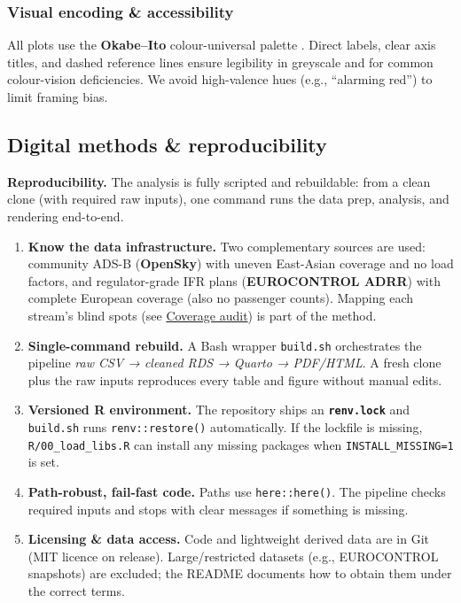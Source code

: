\documentclass[
  authoryear,
  preprint,
  3p,
  onecolumn]{elsarticle}
\providecommand{\tightlist}{%
  \setlength{\itemsep}{0pt}\setlength{\parskip}{0pt}}\usepackage{longtable,booktabs,array}
\begin{document}
\subsubsection{Visual encoding \& accessibility}\label{viz-note}

All plots use the \textbf{Okabe--Ito} colour-universal palette
\citep{okabe2008}. Direct labels, clear axis titles, and dashed
reference lines ensure legibility in greyscale and for common
colour-vision deficiencies. We avoid high-valence hues (e.g., ``alarming
red'') to limit framing bias.

\subsection{Digital methods \& reproducibility}\label{digmethods}

\textbf{Reproducibility.} The analysis is fully scripted and
rebuildable: from a clean clone (with required raw inputs), one command
runs the data prep, analysis, and rendering end-to-end.

\begin{enumerate}
\def\labelenumi{\arabic{enumi}.}
\tightlist
\item
  \textbf{Know the data infrastructure.} Two complementary sources are
  used: community ADS-B (\textbf{OpenSky}) with uneven East-Asian
  coverage and no load factors, and regulator-grade IFR plans
  (\textbf{EUROCONTROL ADRR}) with complete European coverage (also no
  passenger counts). Mapping each stream's blind spots (see
  \hyperref[coverage-audit]{Coverage audit}) is part of the method.
\item
  \textbf{Single-command rebuild.} A Bash wrapper \texttt{build.sh}
  orchestrates the pipeline \emph{raw CSV → cleaned RDS → Quarto →
  PDF/HTML}. A fresh clone plus the raw inputs reproduces every table
  and figure without manual edits.
\item
  \textbf{Versioned R environment.} The repository ships an
  \textbf{\texttt{renv.lock}} and \texttt{build.sh} runs
  \texttt{renv::restore()} automatically. If the lockfile is missing,
  \texttt{R/00\_load\_libs.R} can install any missing packages when
  \texttt{INSTALL\_MISSING=1} is set.
\item
  \textbf{Path-robust, fail-fast code.} Paths use \texttt{here::here()}.
  The pipeline checks required inputs and stops with clear messages if
  something is missing.
\item
  \textbf{Licensing \& data access.} Code and lightweight derived data
  are in Git (MIT licence on release). Large/restricted datasets (e.g.,
  EUROCONTROL snapshots) are excluded; the README documents how to
  obtain them under the correct terms.
\end{enumerate}
\end{document}
